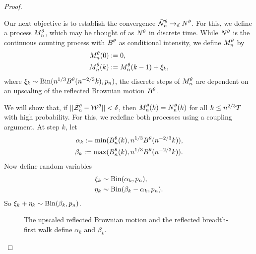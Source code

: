 \begin{proof}

\begin{proofpart}
Our next objective is to establish the convergence $\bar{\mathcal{N}}_n^{\theta} \rightarrow_d N^{\theta}$.
For this, we define a process $M_n^{\theta}$, which may be thought of as $N^{\theta}$ in discrete time.
While $N^{\theta}$ is the continuous counting process with $B^{\theta}$ as conditional intensity,
we define $M_n^{\theta}$ by
\begin{equation}
\begin{aligned}
M_n^{\theta}(0) &:= 0, \\
M_n^{\theta}(k) &:= M_n^{\theta}(k-1) + \xi_k, 
\end{aligned}
\end{equation}
where $\xi_k \sim \operatorname*{Bin}(n^{1 / 3}B^{\theta}(n^{-2 / 3}k), p_n)$,
the discrete steps of $M_n^{\theta}$ are dependent on an upscaling of the reflected Brownian motion $B^{\theta}$.

We will show that, if $||\bar{\mathcal{Z}}^{\theta}_n - \mathcal{W}^{\theta}|| < \delta$, 
then $M_n^{\theta}(k) = N_n^{\theta}(k)$ for all $k \leq n^{2 / 3}T$ with high probability.
For this, we redefine both processes using a coupling argument.
At step $k$, let
\begin{equation} \label{E: def alpha beta}
\begin{aligned}
\alpha_k := \min(B_n^{\theta}(k), n^{1 / 3}B^{\theta}(n^{-2 / 3}k)), \\
\beta_k := \max(B_n^{\theta}(k), n^{1 / 3}B^{\theta}(n^{-2 / 3}k)).
\end{aligned}
\end{equation}
Now define random variables
\begin{equation} \label{E: def xi eta}
\begin{aligned}
\xi_k &\sim \operatorname*{Bin}(\alpha_k, p_n), \\
\eta_k &\sim \operatorname*{Bin}(\beta_k - \alpha_k, p_n).
\end{aligned}
\end{equation}
So $\xi_k + \eta_k \sim \operatorname*{Bin}(\beta_k, p_n)$.

\begin{figure}[ht]
	\centering
	
	\caption{The upscaled reflected Brownian motion and the reflected breadth-first walk define $\alpha_k$ and $\beta_k$.} 
	\label{F: BM BF-walk}
\end{figure}


\end{proofpart}
\end{proof}
